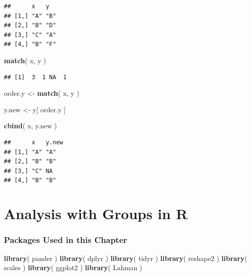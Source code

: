 \documentclass[]{book}
\newenvironment{Shaded}{\begin{snugshade}}{\end{snugshade}}
\newcommand{\KeywordTok}[1]{\textcolor[rgb]{0.13,0.29,0.53}{\textbf{#1}}}
\newcommand{\NormalTok}[1]{#1}
\newcommand{\StringTok}[1]{\textcolor[rgb]{0.31,0.60,0.02}{#1}}
\theoremstyle{definition}
\theoremstyle{definition}
\theoremstyle{definition}
\theoremstyle{remark}
\begin{document}
\begin{verbatim}
##      x   y  
## [1,] "A" "B"
## [2,] "B" "D"
## [3,] "C" "A"
## [4,] "B" "F"
\end{verbatim}

\begin{Shaded}
\begin{Highlighting}[]
\KeywordTok{match}\NormalTok{( x, y )}
\end{Highlighting}
\end{Shaded}

\begin{verbatim}
## [1]  3  1 NA  1
\end{verbatim}

\begin{Shaded}
\begin{Highlighting}[]
\NormalTok{order.y <-}\StringTok{ }\KeywordTok{match}\NormalTok{( x, y )}

\NormalTok{y.new <-}\StringTok{ }\NormalTok{y[ order.y ]}

\KeywordTok{cbind}\NormalTok{( x, y.new )}
\end{Highlighting}
\end{Shaded}

\begin{verbatim}
##      x   y.new
## [1,] "A" "A"  
## [2,] "B" "B"  
## [3,] "C" NA   
## [4,] "B" "B"
\end{verbatim}

\hypertarget{analysis-with-groups-in-r}{%
\chapter{Analysis with Groups in R}\label{analysis-with-groups-in-r}}

\hypertarget{packages-used-in-this-chapter-1}{%
\subsection{Packages Used in this
Chapter}\label{packages-used-in-this-chapter-1}}

\begin{Shaded}
\begin{Highlighting}[]
\KeywordTok{library}\NormalTok{( pander )}
\KeywordTok{library}\NormalTok{( dplyr )}
\KeywordTok{library}\NormalTok{( tidyr )}
\KeywordTok{library}\NormalTok{( reshape2 )}
\KeywordTok{library}\NormalTok{( scales )}
\KeywordTok{library}\NormalTok{( ggplot2 )}
\KeywordTok{library}\NormalTok{( Lahman )}
\end{Highlighting}
\end{Shaded}
\end{document}
